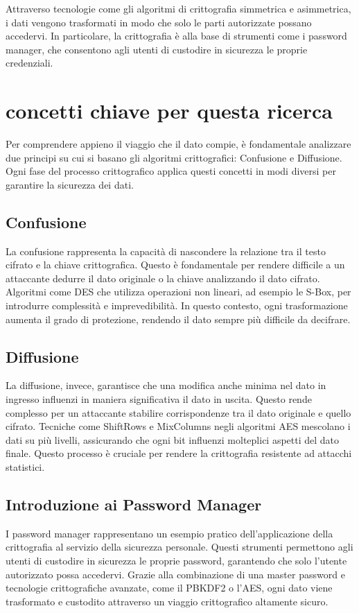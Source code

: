 \documentclass[a4paper,12pt]{report}
\begin{document}
		Attraverso tecnologie come gli algoritmi di crittografia simmetrica e
		asimmetrica, i dati vengono trasformati in modo che solo le parti
		autorizzate possano accedervi. In particolare, la crittografia è alla
		base di strumenti come i password manager, che consentono agli utenti di
		custodire in sicurezza le proprie credenziali.
		\section{concetti chiave per questa ricerca}
		Per comprendere appieno il viaggio che il dato compie, è fondamentale
		analizzare due principi su cui si basano gli algoritmi crittografici:
		Confusione e Diffusione. Ogni fase del processo crittografico applica
		questi concetti in modi diversi per garantire la sicurezza dei dati.

			\subsection{Confusione}
			La confusione rappresenta la capacità di nascondere la relazione tra
			il testo cifrato e la chiave crittografica. Questo è fondamentale
			per rendere difficile a un attaccante dedurre il dato originale o la
			chiave analizzando il dato cifrato. Algoritmi come DES che utilizza
			operazioni non lineari, ad esempio le S-Box, per introdurre complessità e
			imprevedibilità. In questo contesto, ogni trasformazione aumenta il
			grado di protezione, rendendo il dato sempre più difficile da
			decifrare.

			\subsection{Diffusione}
			La diffusione, invece, garantisce che una modifica anche minima nel
			dato in ingresso influenzi in maniera significativa il dato in
			uscita. Questo rende complesso per un attaccante stabilire
			corrispondenze tra il dato originale e quello cifrato. Tecniche come
			ShiftRows e MixColumns negli algoritmi AES mescolano i dati su più
			livelli, assicurando che ogni bit influenzi molteplici aspetti del
			dato finale. Questo processo è cruciale per rendere la crittografia
			resistente ad attacchi statistici.

		\subsection*{Introduzione ai Password Manager} 
		I password manager rappresentano un esempio pratico dell’applicazione
		della crittografia al servizio della sicurezza personale. Questi
		strumenti permettono agli utenti di custodire in sicurezza le proprie
		password, garantendo che solo l’utente autorizzato possa accedervi.
		Grazie alla combinazione di una master password e tecnologie
		crittografiche avanzate, come il PBKDF2 o l’AES, ogni dato viene
		trasformato e custodito attraverso un viaggio crittografico altamente
		sicuro.
\end{document}
